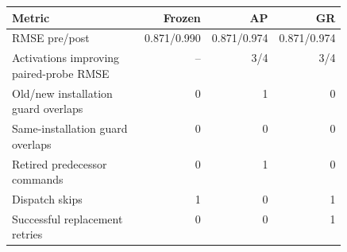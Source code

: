 \begin{tabular}{@{}p{0.49\linewidth}rrr@{}}
\toprule
Metric & Frozen & AP & GR \\
\midrule
RMSE pre/post & 0.871/0.990 & 0.871/0.974 & 0.871/0.974 \\
Activations improving paired-probe RMSE & -- & 3/4 & 3/4 \\
Old/new installation guard overlaps & 0 & 1 & 0 \\
Same-installation guard overlaps & 0 & 0 & 0 \\
Retired predecessor commands & 0 & 1 & 0 \\
Dispatch skips & 1 & 0 & 1 \\
Successful replacement retries & 0 & 0 & 1 \\
\bottomrule
\end{tabular}
